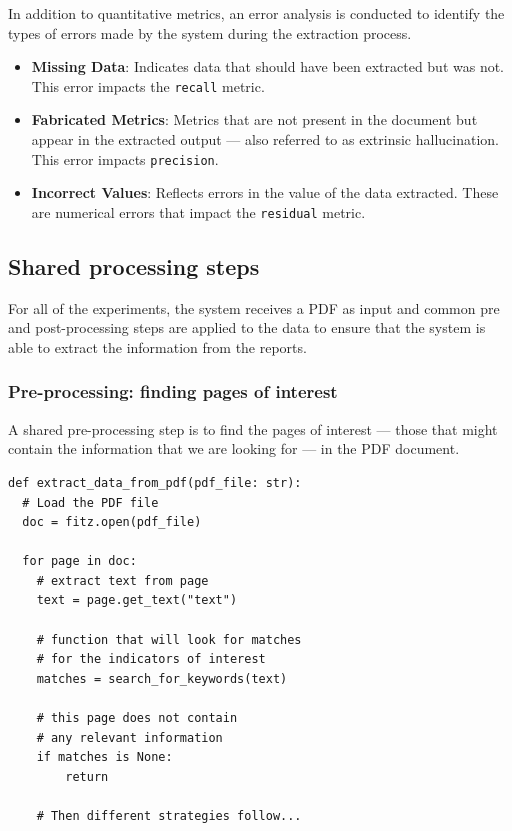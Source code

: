 \documentclass[english, 12pt, a4paper, elec, utf8, a-2b, online]{aaltothesis}
\begin{document}
In addition to quantitative metrics, an error analysis is conducted to identify the types of errors made by the system during the extraction process.

\begin{itemize}
    \item \textbf{Missing Data}: Indicates data that should have been extracted but was not. This error impacts the \texttt{recall} metric.
    \item \textbf{Fabricated Metrics}: Metrics that are not present in the document but appear in the extracted output --- also referred to as extrinsic hallucination. This error impacts \texttt{precision}.
    \item \textbf{Incorrect Values}: Reflects errors in the value of the data extracted. These are numerical errors that impact the \texttt{residual} metric.
\end{itemize}

\subsection{Shared processing steps}

For all of the experiments, the system receives a \ac{PDF} as input and common pre and post-processing steps are applied to the data to ensure that the system is able to extract the information from the reports.

\subsubsection{Pre-processing: finding pages of interest}

A shared pre-processing step is to find the pages of interest --- those that might contain the information that we are looking for --- in the \ac{PDF} document.

\begin{verbatim}
def extract_data_from_pdf(pdf_file: str):
  # Load the PDF file
  doc = fitz.open(pdf_file)

  for page in doc:
    # extract text from page
    text = page.get_text("text")

    # function that will look for matches
    # for the indicators of interest
    matches = search_for_keywords(text)

    # this page does not contain
    # any relevant information
    if matches is None:
        return

    # Then different strategies follow...
\end{verbatim}
\end{document}
